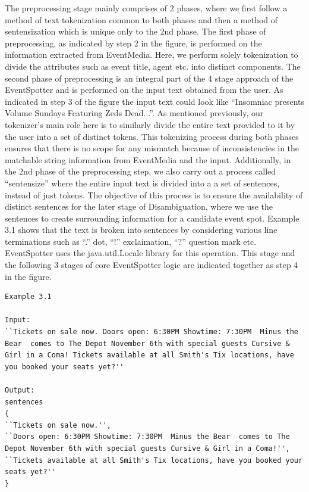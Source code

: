 \documentclass[a4paper,11pt]{report}
\begin{document}
The preprocessing stage mainly comprises of 2 phases, where we first follow a method of text tokenization common to both phases and then a method of sentensization which is unique only to the 2nd phase. The first phase of preprocessing, as indicated by step 2 in the figure, is performed on the information extracted from EventMedia. Here, we perform solely tokenization to divide the attributes such as event title, agent etc. into distinct components. The second phase of preprocessing is an integral part of the 4 stage approach of the EventSpotter and is performed on the input text obtained from the user. As indicated in step 3 of the figure the input text could look like ``Insomniac presents Volume Sundays Featuring Zeds Dead...''.  As mentioned previously, our tokenizer's main role here is to similarly divide the entire text provided to it by the user into a set of distinct tokens. This tokenizing process during both phases ensures that there is no scope for any mismatch because of inconsistencies in the matchable string information from EventMedia and the input. Additionally, in the 2nd phase of the preprocessing step, we also carry out a process called ``sentensize'' where the entire input text is divided into a a set of sentences, instead of just tokens. The objective of this process is to ensure the availability of distinct sentences for the later stage of Disambiguation, where we use the sentences to create surrounding information for a candidate event spot. Example 3.1 shows that the text is broken into sentences by considering various line terminations such as ``.'' dot, ``!'' exclaimation, ``?'' question mark etc.
EventSpotter uses the java.util.Locale library for this operation. This stage and the following 3 stages of core EventSpotter logic are indicated together as step 4 in the figure. \newline
\newline
\newline
\newline
\begin{lstlisting}[caption=This listing shows how sentensization works in EventSpotter]
Example 3.1

Input:
``Tickets on sale now. Doors open: 6:30PM Showtime: 7:30PM  Minus the Bear  comes to The Depot November 6th with special guests Cursive & Girl in a Coma! Tickets available at all Smith's Tix locations, have you booked your seats yet?''

Output:
sentences
{
``Tickets on sale now.'', 
``Doors open: 6:30PM Showtime: 7:30PM  Minus the Bear  comes to The Depot November 6th with special guests Cursive & Girl in a Coma!'',
``Tickets available at all Smith's Tix locations, have you booked your seats yet?''
}
\end{lstlisting}
\end{document}
